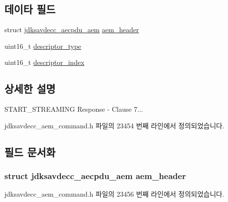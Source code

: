 \subsection*{데이타 필드}
\begin{DoxyCompactItemize}
\item 
struct \hyperlink{structjdksavdecc__aecpdu__aem}{jdksavdecc\+\_\+aecpdu\+\_\+aem} \hyperlink{structjdksavdecc__aem__command__start__streaming__response_ae1e77ccb75ff5021ad923221eab38294}{aem\+\_\+header}
\item 
uint16\+\_\+t \hyperlink{structjdksavdecc__aem__command__start__streaming__response_ab7c32b6c7131c13d4ea3b7ee2f09b78d}{descriptor\+\_\+type}
\item 
uint16\+\_\+t \hyperlink{structjdksavdecc__aem__command__start__streaming__response_a042bbc76d835b82d27c1932431ee38d4}{descriptor\+\_\+index}
\end{DoxyCompactItemize}


\subsection{상세한 설명}
S\+T\+A\+R\+T\+\_\+\+S\+T\+R\+E\+A\+M\+I\+NG Response -\/ Clause 7... 

jdksavdecc\+\_\+aem\+\_\+command.\+h 파일의 23454 번째 라인에서 정의되었습니다.



\subsection{필드 문서화}
\subsubsection[{\texorpdfstring{aem\+\_\+header}{aem_header}}]{\setlength{\rightskip}{0pt plus 5cm}struct {\bf jdksavdecc\+\_\+aecpdu\+\_\+aem} aem\+\_\+header}\hypertarget{structjdksavdecc__aem__command__start__streaming__response_ae1e77ccb75ff5021ad923221eab38294}{}\label{structjdksavdecc__aem__command__start__streaming__response_ae1e77ccb75ff5021ad923221eab38294}


jdksavdecc\+\_\+aem\+\_\+command.\+h 파일의 23456 번째 라인에서 정의되었습니다.


